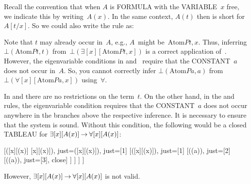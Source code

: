 \documentclass[10pt,a4paper]{article}
\newcommand*{\olup}[1]{\MakeUppercase{#1}}
\theoremstyle{plain}
\theoremstyle{definition}
\theoremstyle{remark}
\newenvironment{explain}{}{}
\providecommand{\AxiomC}[1]{}
\providecommand{\UnaryInfC}[1]{}
\providecommand{\RightLabel}[1]{}
\newenvironment{prooftree}{}{}
\providecommand{\lif}{\mathbin{\rightarrow}}
\providecommand{\lforall}{\mathord{\forall}}
\providecommand{\lexists}{\mathord{\exists}}
\providecommand{\Subst}[3]{#1[#2/#3]}
\providecommand{\sFmla}[2]{#1(#2)}
\providecommand{\formula}{\relax}
\providecommand{\True}{\top}
\providecommand{\False}{\bot}
\providecommand{\Obj}{}
\providecommand{\TAss}[1]{}
\providecommand{\TRule}[1]{}
\providecommand{\Atom}{\mathrm{Atom}}
\providecommand{\formula}[1]{#1}
\begin{document}
\begin{explain}
Recall the convention that when $A$ is \olup{formula} with the
\olup{variable}~$x$ free, we indicate this by writing~$A(x)$. In the
same context, $A(t)$ then is short for~$\Subst{A}{t}{x}$. So we
could also write the \TRule{\False}{\lexists} rule as:
\begin{prooftree}
  \AxiomC{\sFmla{\False}{\lexists[x][A]}}
  \RightLabel{\TRule{\False}{\lexists}}
  \UnaryInfC{\sFmla{\False}{\Subst{A}{t}{x}}}
\end{prooftree}
Note that $t$ may already occur in~$A$, e.g., $A$~might
be~$\Atom{\Obj P}{t,x}$. Thus, inferring $\sFmla{\False}{\Atom{\Obj
P}{t,t}}$ from~$ \sFmla{\False}{\lexists[x][\Atom{\Obj P}{t,x}]}$ is
a correct application of~\TRule{\False}{\lexists}. However, the
eigenvariable conditions in \TRule{\False}{\lforall}
and~\TRule{\True}{\lexists} require that the \olup{constant}~$a$ does
not occur in~$A$. So, you cannot correctly infer
$\sFmla{\False}{\Atom{\Obj P}{a,a}}$ from
$\sFmla{\False}{\lforall[x][\Atom{\Obj P}{a,x}]}$
using~$\TRule{\False}{\lforall}$.
\end{explain}

\begin{explain}
In \TRule{\True}{\lforall} and \TRule{\False}{\lexists} there are no
restrictions on the term~$t$. On the other hand, in the
\TRule{\True}{\lexists} and \TRule{\False}{\lforall} rules, the
eigenvariable condition requires that the \olup{constant}~$a$ does not
occur anywhere in the branches above the respective inference. It is
necessary to ensure that the system is sound. Without this condition,
the following would be a closed \olup{tableau} for
$\lexists[x][\formula{A}(x)] \lif \lforall[x][\formula{A}(x)]$:
\begin{center}
\begin{tableau}{}
  [\sFmla{\False}{\lexists[x][\formula{A}(x)] \lif \lforall[x][\formula{A}(x)]}, just=\TAss
    [\sFmla{\True}{\lexists[x][\formula{A}(x)]},
      just={\TRule{\False}{\lif}[1]}
      [\sFmla{\False}{\lforall[x][\formula{A}(x)]},
        just={\TRule{\False}{\lif}[1]}
        [\sFmla{\True}{\formula{A}(a)},
          just={\TRule{\True}{\lexists}[2]}
          [\sFmla{\False}{\formula{A}(a)},
            just={\TRule{\False}{\lforall}[3]}, close]
        ]
      ]
    ]
  ]
\end{tableau}
\end{center}
However, $\lexists[x][\formula{A}(x)] \lif
\lforall[x][\formula{A}(x)]$ is not valid.
\end{explain}
\end{document}
